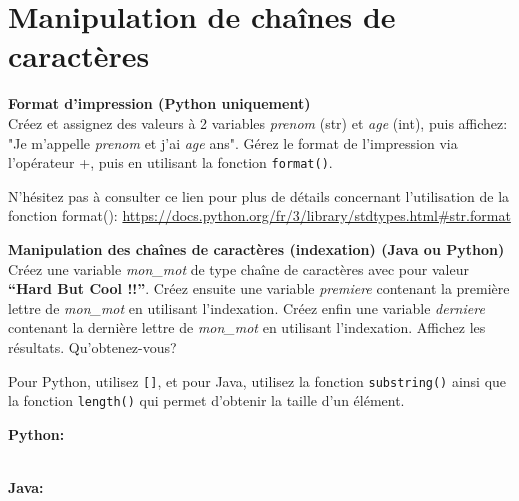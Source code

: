 \section{Manipulation de chaînes de caractères}

\begin{Exercice}[5 minutes] \textbf{Format d'impression (Python uniquement)}\\
   Créez et assignez des valeurs à 2 variables \textit{prenom} (str) et \textit{age} (int), puis affichez: "Je m'appelle \textit{prenom} et j'ai \textit{age} ans". Gérez le format de l'impression via l'opérateur +, puis en utilisant la fonction \lstinline{format()}. \\
   
    \begin{conseil}
       N'hésitez pas à consulter ce lien pour plus de détails concernant l'utilisation de la fonction format(): \url{https://docs.python.org/fr/3/library/stdtypes.html\#str.format}
    \end{conseil}
    \begin{solution}
     
    
           
    \end{solution}   
\end{Exercice}

\begin{Exercice}[5 minutes] \textbf{Manipulation des chaînes de caractères (indexation) (Java ou Python)}\\
   Créez une variable \textit{mon\_mot} de type chaîne de caractères avec pour valeur \textbf{``Hard But Cool !!''}. Créez ensuite une variable \textit{premiere} contenant la première lettre de \textit{mon\_mot} en utilisant l'indexation. Créez enfin une variable \textit{derniere} contenant la dernière lettre de \textit{mon\_mot} en utilisant l'indexation. Affichez les résultats. Qu'obtenez-vous? \\
   
    \begin{conseil}
      	Pour Python, utilisez \lstinline{[]}, et pour Java, utilisez la fonction \lstinline{substring()} ainsi que la fonction \lstinline{length()} qui permet d'obtenir la taille d'un élément.
        
    \end{conseil}
    \begin{solution}
    
    \textbf{Python:}
    
    
    \textbf{\\Java:}
    
           
    \end{solution}   
\end{Exercice}

